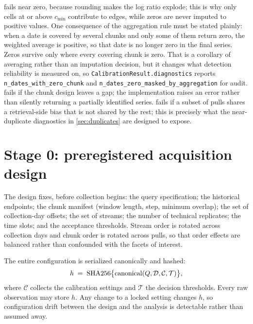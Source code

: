 \documentclass[12pt,a4paper,oneside]{article}
\begin{document}
\begin{remark}
 fails near zero, because rounding makes the log ratio explode;
this is why only cells at or above $c_{\min}$ contribute to edges, while zeros
are never imputed to positive values. One consequence of the aggregation rule
must be stated plainly: when a date is covered by several chunks and only some
of them return zero, the weighted average is positive, so that date is no longer
zero in the final series. Zeros survive only where every covering chunk is zero.
That is a corollary of averaging rather than an imputation decision, but it
changes what detection reliability is measured on, so
\texttt{CalibrationResult.\allowbreak diagnostics} reports
\texttt{n\_dates\_with\_zero\_chunk} and
\texttt{n\_dates\_zero\_masked\_by\_aggregation} for audit.  fails if the chunk design leaves a gap; the
implementation raises an error rather than silently returning a partially
identified series.  fails if a subset of pulls shares a
retrieval-side bias that is not shared by the rest; this is precisely what the
near-duplicate diagnostics in \cref{sec:duplicates} are designed to expose.
\end{remark}

\section{Stage 0: preregistered acquisition design}\label{sec:design}

The design fixes, before collection begins: the query specification; the
historical endpoints; the chunk manifest (window length, step, minimum overlap);
the set of collection-day offsets; the set of streams; the number of technical
replicates; the time slots; and the acceptance thresholds. Stream order is
rotated across collection days and chunk order is rotated across pulls, so that
order effects are balanced rather than confounded with the facets of interest.

The entire configuration is serialized canonically and hashed:
\begin{equation}
h \;=\; \mathrm{SHA256}\big\{\mathrm{canonical}(Q, \mathcal{D}, \mathcal{C}, \mathcal{T})\big\},
\label{eq:hash}
\end{equation}
where $\mathcal{C}$ collects the calibration settings and $\mathcal{T}$ the
decision thresholds. Every raw observation may store $h$. Any change to a locked
setting changes $h$, so configuration drift between the design and the analysis
is detectable rather than assumed away.
\end{document}
